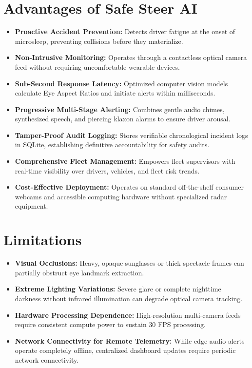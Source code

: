 \documentclass[a4paper,12pt]{report}
\begin{document}
\section{Advantages of Safe Steer AI}
\begin{itemize}
    \item \textbf{Proactive Accident Prevention:} Detects driver fatigue at the onset of microsleep, preventing collisions before they materialize.
    \item \textbf{Non-Intrusive Monitoring:} Operates through a contactless optical camera feed without requiring uncomfortable wearable devices.
    \item \textbf{Sub-Second Response Latency:} Optimized computer vision models calculate Eye Aspect Ratios and initiate alerts within milliseconds.
    \item \textbf{Progressive Multi-Stage Alerting:} Combines gentle audio chimes, synthesized speech, and piercing klaxon alarms to ensure driver arousal.
    \item \textbf{Tamper-Proof Audit Logging:} Stores verifiable chronological incident logs in SQLite, establishing definitive accountability for safety audits.
    \item \textbf{Comprehensive Fleet Management:} Empowers fleet supervisors with real-time visibility over drivers, vehicles, and fleet risk trends.
    \item \textbf{Cost-Effective Deployment:} Operates on standard off-the-shelf consumer webcams and accessible computing hardware without specialized radar equipment.
\end{itemize}

\section{Limitations}
\begin{itemize}
    \item \textbf{Visual Occlusions:} Heavy, opaque sunglasses or thick spectacle frames can partially obstruct eye landmark extraction.
    \item \textbf{Extreme Lighting Variations:} Severe glare or complete nighttime darkness without infrared illumination can degrade optical camera tracking.
    \item \textbf{Hardware Processing Dependence:} High-resolution multi-camera feeds require consistent compute power to sustain 30 FPS processing.
    \item \textbf{Network Connectivity for Remote Telemetry:} While edge audio alerts operate completely offline, centralized dashboard updates require periodic network connectivity.
\end{itemize}
\end{document}
